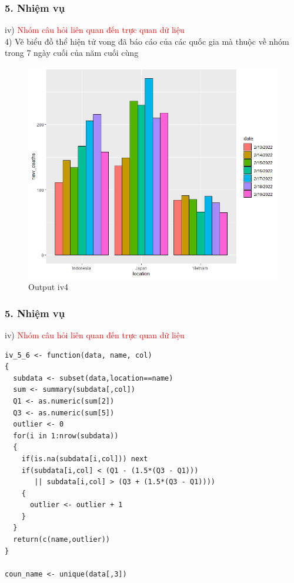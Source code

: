 \documentclass[english,10pt,table]{beamer}
\begin{document}
\begin{frame}[fragile]
\frametitle{5.  Nhiệm vụ}
	iv) \textcolor{red}{Nhóm câu hỏi liên quan đến trực quan dữ liệu}\\%
    4) Vẽ biểu đồ thể hiện tử vong đã báo cáo của các quốc gia  mà thuộc về nhóm trong 7 ngày cuối của năm cuối cùng
	\begin{figure}[h!]
	\begin{center}
		    \includegraphics[scale = 0.4]{Images/IV/iv (4).png}
		     \caption{Output iv4}
		\end{center}
		\end{figure}
\end{frame}

\begin{frame}[fragile]
\frametitle{5.  Nhiệm vụ}
iv) \textcolor{red}{Nhóm câu hỏi liên quan đến trực quan dữ liệu}\\
\lstset{
    title=Function and Prep for iv5-6}
\begin{lstlisting}[frame=single]  
iv_5_6 <- function(data, name, col)
{
  subdata <- subset(data,location==name)
  sum <- summary(subdata[,col])
  Q1 <- as.numeric(sum[2])
  Q3 <- as.numeric(sum[5])
  outlier <- 0
  for(i in 1:nrow(subdata))
  {
    if(is.na(subdata[i,col])) next
    if(subdata[i,col] < (Q1 - (1.5*(Q3 - Q1))) 
       || subdata[i,col] > (Q3 + (1.5*(Q3 - Q1))))
    {
      outlier <- outlier + 1
    }
  }
  return(c(name,outlier))
}

coun_name <- unique(data[,3])
\end{lstlisting}
\end{frame}
\end{document}
